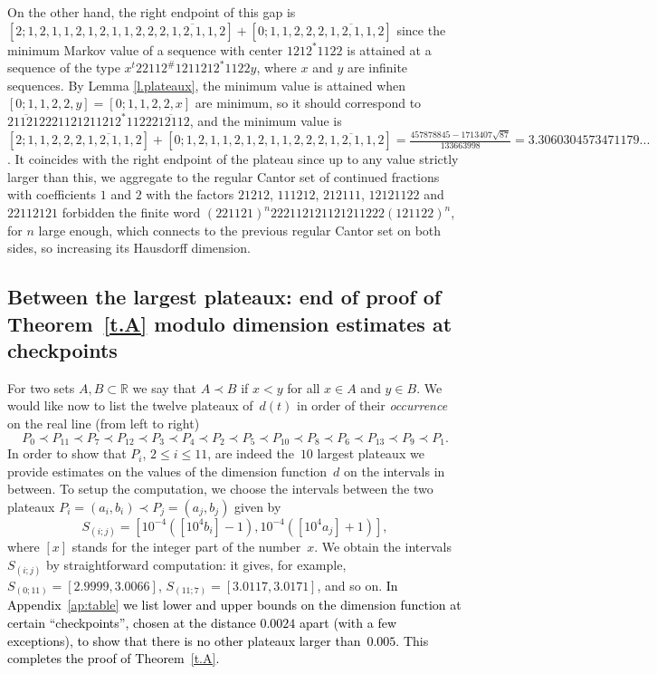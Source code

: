 \documentclass[10pt]{amsart}
\numberwithin{equation}{section}
\theoremstyle{definition}
\def\leq{\leqslant }
\newcommand\intpx[2]{S_{(#1;#2)}}
\newcommand\pvshort[1]{\textcolor{black}{#1} }
\begin{document}
On the other hand, the right endpoint of this gap is $[2;1,2,1,1,2,1,2,1,1,2,2,\overline{2,1,2,1,1,2}]+[0;1,1,2,2,\overline{2,1,2,1,1,2}]$ since
the minimum Markov value of a sequence with center $1212^*1122$ is attained at a sequence of the type $x^t22112^{\#}1211212^*1122y$, where $x$ and $y$ are infinite sequences. By Lemma \ref{l.plateaux}, the minimum value is attained when $[0;1,1,2,2,y]=[0;1,1,2,2,x]$ are minimum, so it should correspond to $\overline{211212}221121211212^*1122\overline{212112}$, and the minimum value is $[2;1,1,2,2,\overline{2,1,2,1,1,2}]+[0;1,2,1,1,2,1,2,1,1,2,2,\overline{2,1,2,1,1,2}]=\frac{457878845-1713407\sqrt{87}}{133663998}=3.3060304573471179...$. It coincides with the right endpoint of the plateau since up to any value strictly larger than this, we aggregate to the regular Cantor set of continued fractions with coefficients $1$ and $2$ with the factors $21212$, $111212$, $212111$, $12121122$ and $22112121$ forbidden the finite word $(221121)^n 222112121121211222 (121122)^n$, for $n$ large enough, which connects to the previous regular Cantor set on both sides, so increasing its Hausdorff dimension.



\subsection{Between the largest plateaux: end of proof of Theorem~\ref{t.A} modulo dimension estimates at checkpoints}
\label{ss:inbetween}
For two sets $A, B \subset \mathbb R$ we say that $A \prec B$ if $x<y$ for all
$x\in A$ and $y\in B$. We would like now to list the twelve plateaux of~$d(t)$ in order of
their \emph{occurrence}
on the real line (from left to right) %
$$
P_0 \prec P_{11} \prec P_7 \prec P_{12} \prec P_3 \prec P_4 \prec P_2 \prec P_5 \prec
P_{10} \prec P_8 \prec P_6 \prec P_{13} \prec P_9 \prec P_1. 
$$ 
In order to show that $P_i$, $2\leq i\leq 11$, are indeed the~$10$ largest plateaux we provide estimates
on the values of the dimension function~$d$ on the intervals in between. 
To setup the computation, we choose the intervals between the two plateaux
$P_i = (a_i,b_i) \prec P_j=(a_j, b_j)$ given by 
$$
\intpx{i}{j}=[10^{-4}([10^4 b_{i}]-1),10^{-4} ([10^4 a_j]+1)],
$$
where $[x]$ stands for the integer part of the number~$x$. 
We obtain the intervals $\intpx{i}{j}$ by straightforward
computation: it gives, for example, $ \intpx{0}{11} =  [2.9999,3.0066] $, 
$ \intpx{11}{7} =  [3.0117,3.0171] $, and so on. 
\pvshort{In Appendix~\ref{ap:table} we list lower and upper bounds on the
dimension function at certain ``checkpoints'', chosen at the distance $0.0024$
apart (with a few exceptions), to show that there is no other plateaux larger
than~$0.005$. 
This completes the proof of Theorem~\ref{t.A}. }
\end{document}
